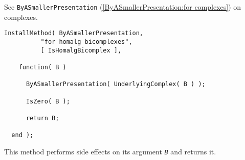 \documentclass[a4paper,11pt]{report}
\begin{document}
{{{ See \texttt{ByASmallerPresentation} (\ref{ByASmallerPresentation:for complexes}) on complexes. 
\begin{Verbatim}[fontsize=\small,frame=single,label=Code]
  InstallMethod( ByASmallerPresentation,
          "for homalg bicomplexes",
          [ IsHomalgBicomplex ],
          
    function( B )
      
      ByASmallerPresentation( UnderlyingComplex( B ) );
      
      IsZero( B );
      
      return B;
      
  end );
\end{Verbatim}
 This method performs side effects on its argument \mbox{\texttt{\slshape B}} and returns it. }

 }

  }

   
\end{document}

